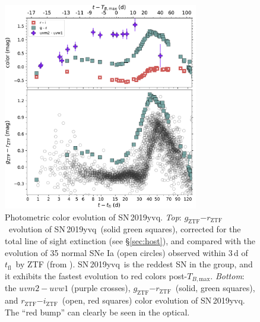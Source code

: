 \documentclass[twocolumn]{aastex63}
\newcommand{\rztf}{$r_\mathrm{ZTF}$}
\newcommand{\gztf}{$g_\mathrm{ZTF}$}
\newcommand{\iztf}{$i_\mathrm{ZTF}$}
\newcommand{\tfl}{$t_\mathrm{fl}$}
\newcommand{\tbmax}{$T_{B,\mathrm{max}}$}
\newcommand{\sn}{SN\,2019yvq}
\begin{document}
\begin{figure}
    \centering
    \includegraphics[width=3.35in]{./figures/P48_colors.pdf}
    \caption{Photometric color evolution of \sn. \textit{Top}: \gztf$ -
    $\rztf\ evolution of \sn\ (solid green squares), corrected for the total
    line of sight extinction (see \S\ref{sec:host}), and compared with the
    evolution of 35 normal SNe Ia (open circles) observed within 3\,d of
    \tfl\ by ZTF (from \citealt{Bulla20}). \sn\ is the reddest SN in the
    group, and it exhibits the fastest evolution to red colors post-\tbmax.
    \textit{Bottom}: the $uvm2 - uvw1$ (purple crosses), \gztf$ - $\rztf\
    (solid, green squares), and \rztf$ - $\iztf\ (open, red squares) color
    evolution of \sn. The ``red bump'' can clearly be seen in the
    optical.}
    \label{fig:colors}
\end{figure}
\end{document}
